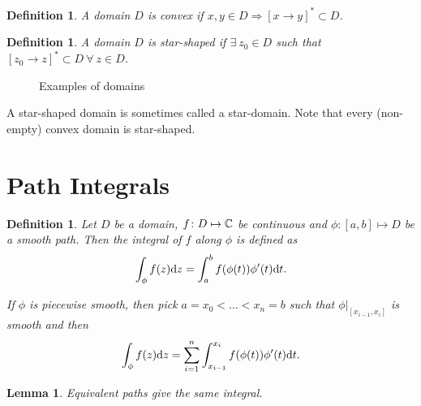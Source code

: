 \documentclass{notes}
\theoremstyle{plain}
\newtheorem{definition}[proposition]{Definition}
\newtheorem{lemma}[proposition]{Lemma}
\begin{document}
\begin{definition}
A domain $D$ is convex if
$x, y \in D \Rightarrow [x \rightarrow y]^* \subset D$.
\end{definition}

\begin{definition}
A domain $D$ is star-shaped
if $\exists\ z_0 \in D$ such that
$[z_0 \rightarrow z]^* \subset D\ \forall\ z \in D$.
\end{definition}

\begin{figure}[h]
\begin{center}
\end{center}
\caption{Examples of domains}
\end{figure}

A star-shaped domain is sometimes called a star-domain.  Note that every
(non-empty) convex domain is star-shaped.

\section{Path Integrals}

\begin{definition}
Let $D$ be a domain, $f \colon D \mapsto \mathbb{C}$ be continuous and $\phi \colon [a,b]
\mapsto D$ be a smooth path.  Then the integral of $f$ along $\phi$ is defined
as
\[
\int_\phi f(z) \mathrm{d} z = \int_a^b f(\phi(t)) \phi'(t) \mathrm{d} t.
\]

If $\phi$ is piecewise smooth, then pick $a = x_0 < \dots < x_n = b$ such
that $\phi \bigr|_{[x_{i-1},x_i]}$ is smooth and then
\[
\int_\phi f(z) \mathrm{d} z = \sum_{i=1}^n \int_{x_{i-1}}^{x_i} f(\phi(t)) \phi'(t) \mathrm{d} t.
\]
\end{definition}

\begin{lemma}
Equivalent paths give the same integral.
\end{lemma}
\end{document}
